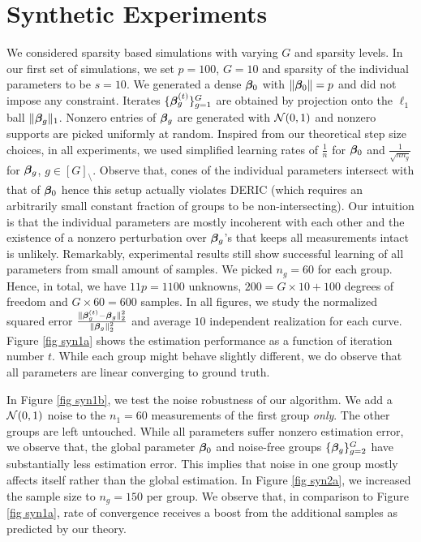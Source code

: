 \section{Synthetic Experiments}
\label{sec:expds}
We considered sparsity based simulations with varying $G$ and sparsity levels. In our first set of simulations, we set $p=100$, $G=10$ and sparsity of the individual parameters to be $s=10$. We generated a dense $\boldsymbol{\beta}_0$ with $\|\boldsymbol{\beta}_0\|=p$ and did not impose any constraint. Iterates $\{\boldsymbol{\beta}^{(t)}_g\}_{g=1}^G$ are obtained by projection onto the $\ell_1$ ball $\|\boldsymbol{\beta}_g\|_1$. Nonzero entries of $\boldsymbol{\beta}_g$ are generated with ${\cal{N}}(0,1)$ and nonzero supports are picked uniformly at random. Inspired from our theoretical step size choices, in all experiments, we used simplified learning rates of $\frac{1}{n}$ for $\boldsymbol{\beta}_0$ and $\frac{1}{\sqrt{nn_g}}$ for $\boldsymbol{\beta}_g$, $g \in [G]_\setminus$. Observe that, cones of the individual parameters intersect with that of $\boldsymbol{\beta}_0$ hence this setup actually violates DERIC (which requires an arbitrarily small constant fraction of groups to be non-intersecting). Our intuition is that the individual parameters are mostly incoherent with each other and the existence of a nonzero perturbation over $\boldsymbol{\beta}_g$'s that keeps all measurements intact is unlikely. Remarkably, experimental results still show successful learning of all parameters from small amount of samples. We picked $n_g=60$ for each group. Hence, in total, we have $11p=1100$ unknowns, $200=G\times 10+100$ degrees of freedom and $G\times 60=600$ samples. In all figures, we study the normalized squared error $\frac{\|\boldsymbol{\beta}^{(t)}_g-\boldsymbol{\beta}_g\|_2^2}{\|\boldsymbol{\beta}_g\|_2^2}$ and average $10$ independent realization for each curve. Figure \ref{fig syn1a} shows the estimation performance as a function of iteration number $t$. While each group might behave slightly different, we do observe that all parameters are linear converging to ground truth.%
	
In Figure \ref{fig syn1b}, we test the noise robustness of our algorithm. We add a ${\cal{N}}(0,1)$ noise to the $n_1=60$ measurements of the first group \emph{only}. The other groups are left untouched. While all parameters suffer nonzero estimation error, we observe that, the global parameter $\boldsymbol{\beta}_0$ and noise-free groups $\{\boldsymbol{\beta}_g\}_{g=2}^G$ have substantially less estimation error. This implies that noise in one group mostly affects itself rather than the global estimation. In Figure \ref{fig syn2a}, we increased the sample size to $n_g=150$ per group. We observe that, in comparison to Figure \ref{fig syn1a}, rate of convergence receives a boost from the additional samples as predicted by our theory.
	
